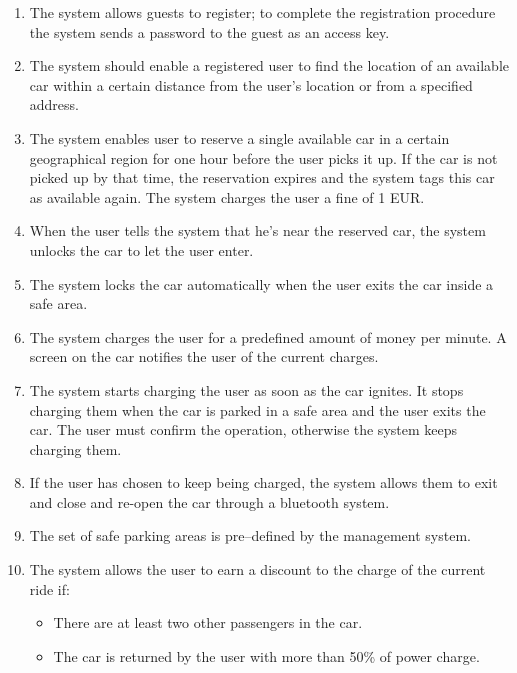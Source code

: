 			
			
						
			
			
			
			\begin{enumerate}
				\item The system allows guests to register; to complete the registration procedure the system sends a password to the guest as an access key.
				\item The system should enable a registered user to find the location of an available car within a certain distance from the user's location or from a specified address.
				\item The system enables user to reserve a single available car in a certain geographical region for one hour before the user picks it up. If the car is not picked up by that time, the reservation expires and the system tags this car as available again. The system charges the user a fine of 1 EUR.
				\item When the user tells the system that he's near the reserved car, the system unlocks the car to let the user enter.  
				\item The system locks the car automatically when the user exits the car inside a safe area.  
				\item The system charges the user for a predefined amount of money per minute. A screen on the car notifies the user of the current charges.
				\item The system starts charging the user as soon as the car ignites. It stops charging them when the car is parked in a safe area and the user exits the car. The user must confirm the operation, otherwise the system keeps charging them. 
				\item If the user has chosen to keep being charged, the system allows them to exit and close and re-open the car through a bluetooth system.
				\item The set of safe parking areas is pre–defined by the management system.
				\item The system allows the user to earn a discount to the charge of the current ride if:
					\begin{itemize}
						\item There are at least two other passengers in the car.
						\item The car is returned by the user with more than 50\% of power charge.

\end{itemize}
\end{enumerate}
